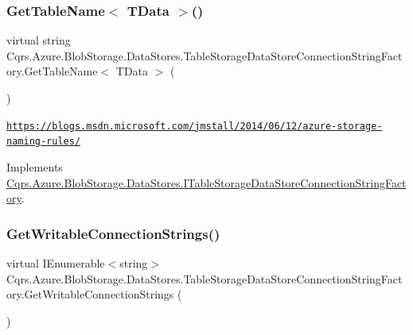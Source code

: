 \subsubsection{\texorpdfstring{Get\+Table\+Name$<$ T\+Data $>$()}{GetTableName< TData >()}}
{\footnotesize\ttfamily virtual string Cqrs.\+Azure.\+Blob\+Storage.\+Data\+Stores.\+Table\+Storage\+Data\+Store\+Connection\+String\+Factory.\+Get\+Table\+Name$<$ T\+Data $>$ (\begin{DoxyParamCaption}{ }\end{DoxyParamCaption})\hspace{0.3cm}{\ttfamily [virtual]}}

\href{https://blogs.msdn.microsoft.com/jmstall/2014/06/12/azure-storage-naming-rules/}{\tt https\+://blogs.\+msdn.\+microsoft.\+com/jmstall/2014/06/12/azure-\/storage-\/naming-\/rules/}

Implements \hyperlink{interfaceCqrs_1_1Azure_1_1BlobStorage_1_1DataStores_1_1ITableStorageDataStoreConnectionStringFactory_a40ff0417d18d0cf9d0f59d6dfddfaa15}{Cqrs.\+Azure.\+Blob\+Storage.\+Data\+Stores.\+I\+Table\+Storage\+Data\+Store\+Connection\+String\+Factory}.

\mbox{\label{classCqrs_1_1Azure_1_1BlobStorage_1_1DataStores_1_1TableStorageDataStoreConnectionStringFactory_a65b6f404ac2434c6366af73a22e914d1}} 
\subsubsection{\texorpdfstring{Get\+Writable\+Connection\+Strings()}{GetWritableConnectionStrings()}}
{\footnotesize\ttfamily virtual I\+Enumerable$<$string$>$ Cqrs.\+Azure.\+Blob\+Storage.\+Data\+Stores.\+Table\+Storage\+Data\+Store\+Connection\+String\+Factory.\+Get\+Writable\+Connection\+Strings (\begin{DoxyParamCaption}{ }\end{DoxyParamCaption})\hspace{0.3cm}{\ttfamily [virtual]}}



